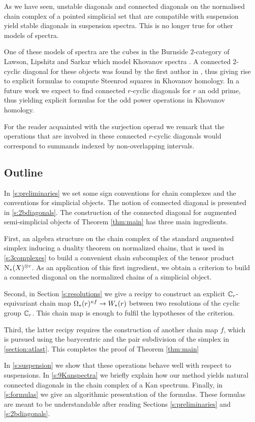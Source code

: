 As we have seen, unstable diagonals and connected diagonals on the normalised chain complex of a pointed simplicial set that are compatible with suspension yield stable diagonals in suspension spectra. This is no longer true for other models of spectra. 

One of these models of spectra are the cubes in the Burnside $2$-category of Lawson, Lipshitz and Sarkar \cite{LLS20} which model Khovanov spectra \cite{LS14}. A connected $2$-cyclic diagonal for these objects was found by the first author in \cite{cantero-moran2020khovanov}, thus giving rise to explicit formulas to compute Steenrod squares in Khovanov homology. In a future work we expect to find connected $r$-cyclic diagonals for $r$ an odd prime, thus yielding explicit formulas for the odd power operations in Khovanov homology.

For the reader acquainted with the surjection operad we remark that the operations that are involved in these connected $r$-cyclic diagonals would correspond to summands indexed by non-overlapping intervals.

\subsection{Outline}

In \cref{s:preliminaries} we set some sign conventions for chain complexes and the conventions for simplicial objects.
The notion of connected diagonal is presented in \cref{s:2bdiagonals}.
The construction of the connected diagonal for augmented semi-simplicial objects of Theorem \ref{thm:main} has three main ingredients.


First, an algebra structure on the chain complex of the standard augmented simplex inducing a duality theorem on normalized chains, that is used in \cref{s:3complexes} to build a convenient chain subcomplex of the tensor product $\operatorname{N}_{*}(X)^{\otimes r}$.
As an application of this first ingredient, we obtain a criterion to build a connected diagonal on the normalized chains of a simplicial object.


Second, in Section \ref{s:resolutions} we give a recipy to construct an explicit $\mathbb{C}_r$-equivariant chain map $\Omega_*(r)^{nf} \to W_*(r)$ between two resolutions of the cyclic group $\mathbb{C}_r$. This chain map is enough to fulfil the hypotheses of the criterion.

Third, the latter recipy requires the construction of another chain map $f$, which is pursued using the barycentric and the pair subdivision of the simplex in \cref{section:atlast}. This completes the proof of Theorem \ref{thm:main}

In \cref{s:suspension} we show that these operations behave well with respect to suspensions.
In \cref{s:9Kanspectra} we briefly explain how our method yields natural connected diagonals in the chain complex of a Kan spectrum.
Finally, in \cref{s:formulas} we give an algorithmic presentation of the formulas.
These formulas are meant to be understandable after reading Sections \ref{s:preliminaries} and \ref{s:2bdiagonals}.